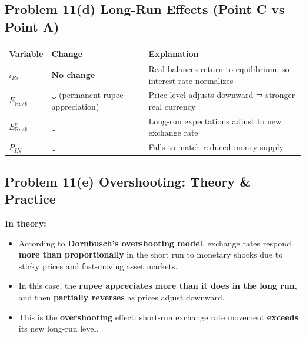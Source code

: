 \documentclass[
]{article}
\providecommand{\tightlist}{%
  \setlength{\itemsep}{0pt}\setlength{\parskip}{0pt}}
\begin{document}
\subsection{Problem 11(d) Long-Run Effects (Point C vs Point
A)}\label{problem-11d-long-run-effects-point-c-vs-point-a}

\begin{longtable}[]{@{}
  >{\raggedright\arraybackslash}p{}
  >{\raggedright\arraybackslash}p{}
  >{\raggedright\arraybackslash}p{}@{}}
\toprule\noalign{}
\begin{minipage}[b]{\linewidth}\raggedright
Variable
\end{minipage} & \begin{minipage}[b]{\linewidth}\raggedright
Change
\end{minipage} & \begin{minipage}[b]{\linewidth}\raggedright
Explanation
\end{minipage} \\
\midrule\noalign{}
\endhead
\bottomrule\noalign{}
\endlastfoot
\(i_{Rs}\) & \textbf{No change} & Real balances return to equilibrium,
so interest rate normalizes \\
\(E_{\text{Rs}/\$}\) & \textbf{↓} (permanent rupee appreciation) & Price
level adjusts downward ⇒ stronger real currency \\
\(E^e_{\text{Rs}/\$}\) & \textbf{↓} & Long-run expectations adjust to
new exchange rate \\
\(P_{IN}\) & \textbf{↓} & Falls to match reduced money supply \\
\end{longtable}

\subsection{Problem 11(e) Overshooting: Theory \&
Practice}\label{problem-11e-overshooting-theory-practice}

\textbf{In theory:}

\begin{itemize}
\tightlist
\item
  According to \textbf{Dornbusch's overshooting model}, exchange rates
  respond \textbf{more than proportionally} in the short run to monetary
  shocks due to sticky prices and fast-moving asset markets.
\item
  In this case, the \textbf{rupee appreciates more than it does in the
  long run}, and then \textbf{partially reverses} as prices adjust
  downward.
\item
  This is the \textbf{overshooting} effect: short-run exchange rate
  movement \textbf{exceeds} its new long-run level.
\end{itemize}
\end{document}
